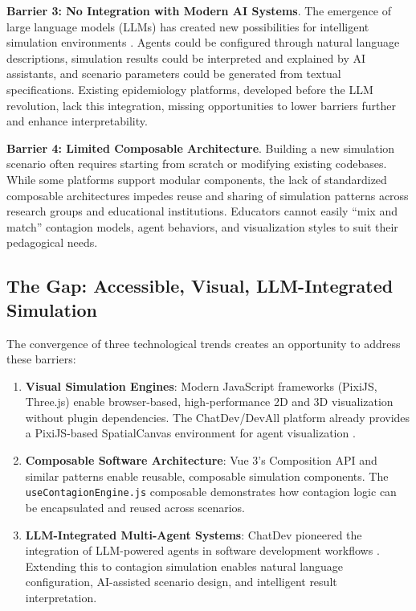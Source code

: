 \textbf{Barrier 3: No Integration with Modern AI Systems}. The emergence of large language models (LLMs) has created new possibilities for intelligent simulation environments \cite{park2023generative}. Agents could be configured through natural language descriptions, simulation results could be interpreted and explained by AI assistants, and scenario parameters could be generated from textual specifications. Existing epidemiology platforms, developed before the LLM revolution, lack this integration, missing opportunities to lower barriers further and enhance interpretability.

\textbf{Barrier 4: Limited Composable Architecture}. Building a new simulation scenario often requires starting from scratch or modifying existing codebases. While some platforms support modular components, the lack of standardized composable architectures impedes reuse and sharing of simulation patterns across research groups and educational institutions. Educators cannot easily ``mix and match'' contagion models, agent behaviors, and visualization styles to suit their pedagogical needs.

\subsection{The Gap: Accessible, Visual, LLM-Integrated Simulation}

The convergence of three technological trends creates an opportunity to address these barriers:

\begin{enumerate}
    \item \textbf{Visual Simulation Engines}: Modern JavaScript frameworks (PixiJS, Three.js) enable browser-based, high-performance 2D and 3D visualization without plugin dependencies. The ChatDev/DevAll platform already provides a PixiJS-based SpatialCanvas environment for agent visualization \cite{qian2023communicative}.
    
    \item \textbf{Composable Software Architecture}: Vue 3's Composition API and similar patterns enable reusable, composable simulation components. The \texttt{useContagionEngine.js} composable demonstrates how contagion logic can be encapsulated and reused across scenarios.
    
    \item \textbf{LLM-Integrated Multi-Agent Systems}: ChatDev pioneered the integration of LLM-powered agents in software development workflows \cite{qian2023communicative}. Extending this to contagion simulation enables natural language configuration, AI-assisted scenario design, and intelligent result interpretation.
\end{enumerate}

